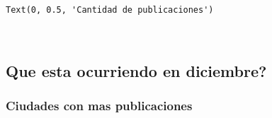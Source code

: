 \documentclass[11pt]{article}
\newcommand{\prompt}[4]{
        \llap{{\color{#2}[#3]: #4}}\vspace{-1.25em}
    }
\begin{document}
            \begin{tcolorbox}[breakable, boxrule=.5pt, size=fbox, pad at break*=1mm, opacityfill=0]
\prompt{Out}{outcolor}{521}{\hspace{3.5pt}}
\begin{Verbatim}[commandchars=\\\{\}]
Text(0, 0.5, 'Cantidad de publicaciones')
\end{Verbatim}
\end{tcolorbox}
        
    \begin{center}
    \end{center}
    { \hspace*{\fill} \\}
    
    \subsection{Que esta ocurriendo en
diciembre?}\label{que-esta-ocurriendo-en-diciembre}

\subsubsection{Ciudades con mas
publicaciones}\label{ciudades-con-mas-publicaciones}
\end{document}
